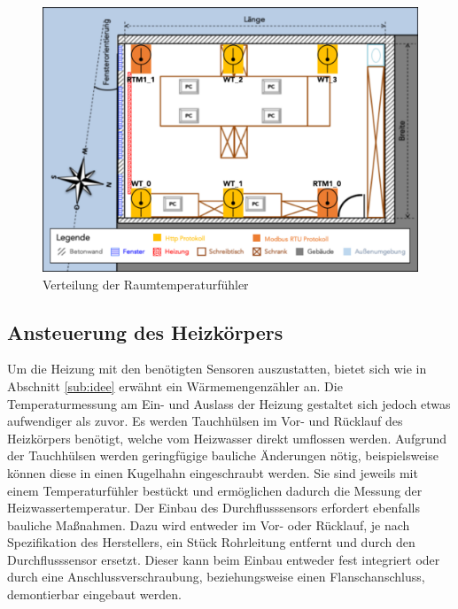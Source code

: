 \begin{figure}
\centering
\includegraphics[width=\textwidth]{abbildungen/20160324_sensors}
\caption{Verteilung der Raumtemperaturfühler}
\label{fig:raumtempsensors}
\end{figure}

\subsection{Ansteuerung des Heizkörpers}

Um die Heizung mit den benötigten Sensoren auszustatten, bietet sich wie in Abschnitt \ref{sub:idee} erwähnt ein Wärmemengenzähler an. Die Temperaturmessung am Ein- und Auslass der Heizung gestaltet sich jedoch etwas aufwendiger als zuvor. Es werden Tauchhülsen im Vor- und Rücklauf des Heizkörpers benötigt, welche vom Heizwasser direkt umflossen werden. Aufgrund der Tauchhülsen werden geringfügige bauliche Änderungen nötig, beispielsweise können diese in einen Kugelhahn eingeschraubt werden. Sie sind jeweils mit einem Temperaturfühler bestückt und ermöglichen dadurch die Messung der Heizwassertemperatur. Der Einbau des Durchflusssensors erfordert ebenfalls bauliche Maßnahmen. Dazu wird entweder im Vor- oder Rücklauf, je nach Spezifikation des Herstellers, ein Stück Rohrleitung entfernt und durch den Durchflusssensor ersetzt. Dieser kann beim Einbau entweder fest integriert oder durch eine Anschlussverschraubung, beziehungsweise einen Flanschanschluss, demontierbar eingebaut werden.

